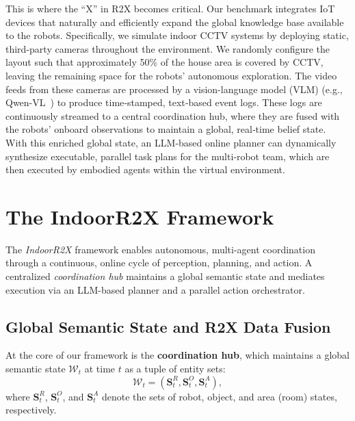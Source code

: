 This is where the ``X'' in R2X becomes critical. Our benchmark integrates IoT devices that naturally and efficiently expand the global knowledge base available to the robots. Specifically, we simulate indoor CCTV systems by deploying static, third-party cameras throughout the environment. We randomly configure the layout such that approximately 50\% of the house area is covered by CCTV, leaving the remaining space for the robots’ autonomous exploration. The video feeds from these cameras are processed by a vision-language model (VLM) (e.g., Qwen-VL~\cite{Qwen-VL}) to produce time‑stamped, text‑based event logs. These logs are continuously streamed to a central coordination hub, where they are fused with the robots’ onboard observations to maintain a global, real‑time belief state. With this enriched global state, an LLM‑based online planner can dynamically synthesize executable, parallel task plans for the multi‑robot team, which are then executed by embodied agents within the virtual environment.





\section{The IndoorR2X Framework}
\label{sec:indoorr2x}




The \textit{IndoorR2X} framework enables autonomous, multi-agent coordination through a continuous, online cycle of perception, planning, and action. A centralized \emph{coordination hub} maintains a global semantic state and mediates execution via an LLM-based planner and a parallel action orchestrator.

\subsection{Global Semantic State and R2X Data Fusion}
\label{subsec:world_model}

At the core of our framework is the \textbf{coordination hub}, which maintains a global semantic state $\mathcal{W}_t$ at time $t$ as a tuple of entity sets:
\begin{equation}
\label{eq:world_model}
\mathcal{W}_t = (\mathbf{S}^R_t, \mathbf{S}^O_t, \mathbf{S}^A_t),
\end{equation}
where $\mathbf{S}^R_t$, $\mathbf{S}^O_t$, and $\mathbf{S}^A_t$ denote the sets of robot, object, and area (room) states, respectively.

